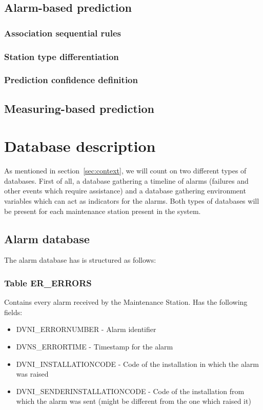 \documentclass[a4paper,10pt]{article}
\begin{document}
\subsection{Alarm-based prediction}
\subsubsection{Association sequential rules}
\subsubsection{Station type differentiation}
\subsubsection{Prediction confidence definition}

\subsection{Measuring-based prediction}

\section{Database description}
As mentioned in section~\ref{sec:context}, we will count on two different types of databases. First of all, a database gathering a timeline of alarms (failures and other events which require assistance) and a database gathering environment variables which can act as indicators for the alarms. Both types of databases will be present for each maintenance station present in the system.

\subsection{Alarm database}
The alarm database has is structured as follows:
\subsubsection*{Table ER\_ERRORS}
Contains every alarm received by the Maintenance Station. Has the following fields:
\begin{itemize}
 \item DVNI\_ERRORNUMBER - Alarm identifier
 \item DVNS\_ERRORTIME - Timestamp for the alarm
 \item DVNI\_INSTALLATIONCODE - Code of the installation in which the alarm was raised
 \item DVNI\_SENDERINSTALLATIONCODE - Code of the installation from which the alarm was sent (might be different from the one which raised it)
\end{itemize}
\end{document}
